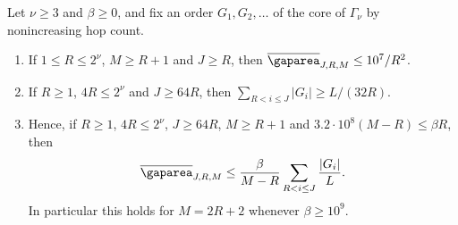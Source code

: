 \begin{theorem}\label{thm:sharpness}
Let $\nu\ge3$ and $\beta\ge0$, and fix an order $G_1,G_2,\dots$ of the core of
$\Gamma_\nu$ by nonincreasing hop count.
\begin{enumerate}[label=(\alph*)]
\item If $1\le R\le2^\nu$, $M\ge R+1$ and $J\ge R$, then
$\meanarea_{J,R,M}\le10^7/R^2$.
\item If $R\ge1$, $4R\le2^\nu$ and $J\ge64R$, then $\sum_{R<i\le J}|G_i|\ge L/(32R)$.
\item Hence, if $R\ge1$, $4R\le2^\nu$, $J\ge64R$, $M\ge R+1$ and
$3.2\cdot10^8(M-R)\le\beta R$, then
\[
 \meanarea_{J,R,M}\le\frac{\beta}{M-R}\sum_{R<i\le J}\frac{|G_i|}L.
\]
In particular this holds for $M=2R+2$ whenever $\beta\ge10^9$.
\end{enumerate}
\end{theorem}

